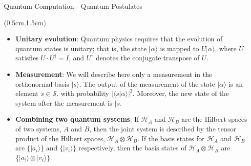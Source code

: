 \documentclass{beamer}
\theoremstyle{definition}
\begin{document}
\begin{frame}{Quantum Computation - Quantum Postulates}
    
    \begin{textblock*}{12cm}(0.5cm,1.5cm)
        \begin{itemize}
            \item \textbf{Unitary evolution}: Quantum physics requires that the evolution of quantum states is unitary; that is, the state $\lvert \alpha \rangle$ is mapped to $U \lvert \alpha \rangle$, where $U$ satisfies $U \cdot U^{\dagger} = I$, and $U^{\dagger}$ denotes the conjugate transpose of $U$.
            \vspace{0.5cm}
            \item \textbf{Measurement}: We will describe here only a measurement in the orthonormal basis $\lvert s \rangle$. The output of the measurement of the state $\lvert \alpha \rangle$ is an element $s \in \mathcal{S}$, with probability $|\langle s \vert \alpha \rangle|^2$. Moreover, the new state of the system after the measurement is $\lvert s$.
            \vspace{0.5cm}
            \item \textbf{Combining two quantum systems}: If $\mathcal{H}_A$ and $\mathcal{H}_B$ are the Hilbert spaces of two systems, $A$ and $B$, then the joint system is described by the tensor product of the Hilbert spaces, $\mathcal{H}_A \otimes \mathcal{H}_B$. If the basis states for $\mathcal{H}_A$ and $\mathcal{H}_B$ are $\{ \lvert a_i \rangle \}$ and $\{ \lvert v_i \rangle \}$ respectively, then the basis states of $\mathcal{H}_A \otimes \mathcal{H}_B$ are $\{ \lvert a_i \rangle \otimes \lvert v_i \rangle \}$.


            
        \end{itemize}
            
    \end{textblock*}
\end{frame}
\end{document}
